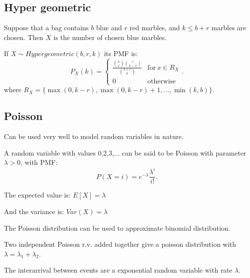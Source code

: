 \subsection{Hyper geometric}

Suppose that a bag contains $b$ blue and $r$ red marbles, and $k \leq b + r$ marbles are chosen.
Then $X$ is the number of chosen blue marbles.

\begin{definition}
    If $X \sim Hypergeometric(b,r,k)$ its PMF is: \[
        P_X(k) = \left\{
            \begin{array}{ll}
                \frac{\binom{b}{x} \binom{r}{k-x}}{\binom{b+r}{k}} & \mathrm{for} \: x \in R_X \\
                0 & \mathrm{otherwise}
            \end{array}
            \right.
    .\] 
    where $R_X = \{\max(0, k-r), \max(0,k-r)+1,...,\min(k,b)\}$.
\end{definition}

\subsection{Poisson}

Can be used very well to model random variables in nature.

\begin{definition}
    A random variable with values 0,2,3,... can be said to be Poisson with parameter $\lambda > 0$, with PMF: \[
        P(X = i) = e^{-\lambda} \frac{\lambda^i}{i!}
    .\] 
\end{definition}

The expected value is: $
    E[X] = \lambda
$ 

And the variance is: $
    Var(X) = \lambda
$ 

The Poisson distribution can be used to approximate binomial distribution.

\begin{lemma}
    Two independent Poisson r.v. added together give a poisson distribution with $\lambda = \lambda_1 + \lambda_2$.
\end{lemma}


\begin{lemma}
    The interarrival between events are a exponential random variable with rate $\lambda$.
\end{lemma}
